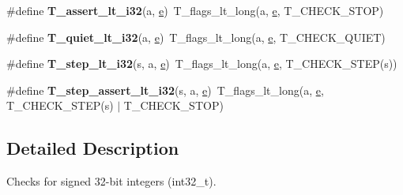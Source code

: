 \begin{DoxyCompactItemize}
\item 
\mbox{\label{group__RTEMSTestFrameworkChecksInt32_gaa923640a3372dc9b8634f51f59fccf6d}} 
\#define {\bfseries T\+\_\+assert\+\_\+lt\+\_\+i32}(a,  \mbox{\hyperlink{sun4u_2tte_8h_a8b0b9ed08e0e18920ec2682f48228c27}{e}})~T\+\_\+flags\+\_\+lt\+\_\+long(a, \mbox{\hyperlink{sun4u_2tte_8h_a8b0b9ed08e0e18920ec2682f48228c27}{e}}, T\+\_\+\+C\+H\+E\+C\+K\+\_\+\+S\+T\+OP)
\item 
\mbox{\label{group__RTEMSTestFrameworkChecksInt32_gaa1776b26dc47d967a8e24811d6a66d36}} 
\#define {\bfseries T\+\_\+quiet\+\_\+lt\+\_\+i32}(a,  \mbox{\hyperlink{sun4u_2tte_8h_a8b0b9ed08e0e18920ec2682f48228c27}{e}})~T\+\_\+flags\+\_\+lt\+\_\+long(a, \mbox{\hyperlink{sun4u_2tte_8h_a8b0b9ed08e0e18920ec2682f48228c27}{e}}, T\+\_\+\+C\+H\+E\+C\+K\+\_\+\+Q\+U\+I\+ET)
\item 
\mbox{\label{group__RTEMSTestFrameworkChecksInt32_gaba3225dbe831098c276b47c5d5fd2067}} 
\#define {\bfseries T\+\_\+step\+\_\+lt\+\_\+i32}(s,  a,  \mbox{\hyperlink{sun4u_2tte_8h_a8b0b9ed08e0e18920ec2682f48228c27}{e}})~T\+\_\+flags\+\_\+lt\+\_\+long(a, \mbox{\hyperlink{sun4u_2tte_8h_a8b0b9ed08e0e18920ec2682f48228c27}{e}}, T\+\_\+\+C\+H\+E\+C\+K\+\_\+\+S\+T\+EP(s))
\item 
\mbox{\label{group__RTEMSTestFrameworkChecksInt32_ga0a52c78005ff59e4125d97c5c5c45de4}} 
\#define {\bfseries T\+\_\+step\+\_\+assert\+\_\+lt\+\_\+i32}(s,  a,  \mbox{\hyperlink{sun4u_2tte_8h_a8b0b9ed08e0e18920ec2682f48228c27}{e}})~T\+\_\+flags\+\_\+lt\+\_\+long(a, \mbox{\hyperlink{sun4u_2tte_8h_a8b0b9ed08e0e18920ec2682f48228c27}{e}}, T\+\_\+\+C\+H\+E\+C\+K\+\_\+\+S\+T\+EP(s) $\vert$ T\+\_\+\+C\+H\+E\+C\+K\+\_\+\+S\+T\+OP)
\end{DoxyCompactItemize}


\subsection{Detailed Description}
Checks for signed 32-\/bit integers (int32\+\_\+t). 

